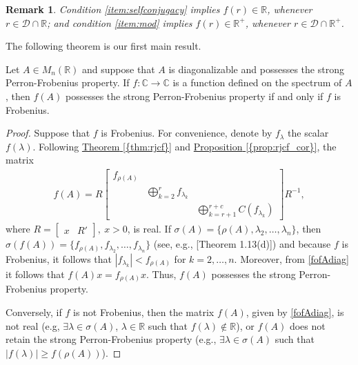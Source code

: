 \documentclass[10pt,twoside,leqno]{siamltex}
\newtheorem{rem}[theorem]{Remark}
\begin{document}
\begin{rem}
{\rm Condition \ref*{item:selfconjugacy} implies $f(r) \in {\mathbb{{R}}}$, whenever $r \in \mathcal{D} \cap {\mathbb{{R}}}$; and condition \ref*{item:mod} implies $f(r) \in {\mathbb{{R}}}^+$, whenever $r \in \mathcal{D} \cap {\mathbb{{R}}}^+$.}
\end{rem}

The following theorem is our first main result. 

\begin{theorem} \label{mainresultdiag}
Let $A \in {M_{{n}}({{\mathbb{{R}}}})}$ and suppose that $A$ is diagonalizable and possesses the strong Perron-Frobenius property. If $f: {\mathbb{{C}}} \longrightarrow {\mathbb{{C}}}$ is a function defined on the spectrum of $A$, then $f(A)$ possesses the strong Perron-Frobenius property if and only if $f$ is Frobenius.
\end{theorem}

\begin{proof}
Suppose that $f$ is Frobenius. For convenience, denote by $f_\lambda$ the scalar $f(\lambda)$. Following {\hyperref[{thm:rjcf}]{{\rm {Theorem} \ref*{{thm:rjcf}}}}} and {\hyperref[{prop:rjcf_cor}]{{\rm {Proposition} \ref*{{prop:rjcf_cor}}}}}, the matrix
\begin{align}  
f(A)  = 
R \begin{bmatrix} 
f_{{\rho\left({A}\right)}} & & 					\\
& \bigoplus_{k=2}^{r} f_{\lambda_k} & 	\\ 
& & \bigoplus_{k = r + 1}^{r + c} C (f_{\lambda_k})  
\end{bmatrix} {{R}^{-1}}, 													\label{fofAdiag} 
\end{align}
where $R= 
\begin{bmatrix}
x & R'
\end{bmatrix},~x>0$,
is real. If ${\sigma \left( {A} \right)} = \{ {\rho\left({A}\right)}, \lambda_2,\dots, \lambda_n \}$, then ${\sigma \left( {f(A)} \right)} = \{ f_{{\rho\left({A}\right)}},f_{\lambda_2},\dots, f_{\lambda_n} \}$ (see, e.g., \cite{h2008}[Theorem 1.13(d)]) and because $f$ is Frobenius, it follows that $|f_{\lambda_k}| < f_{{\rho\left({A}\right)}}$ for $k = 2,\dots, n$. Moreover, from \eqref{fofAdiag} it follows that $f(A)x = f_{{\rho\left({A}\right)}} x$. Thus, $f(A)$ possesses the strong Perron-Frobenius property.  

Conversely, if $f$ is not Frobenius, then the matrix $f(A)$, given by \eqref{fofAdiag}, is not real (e.g, $\exists \lambda \in {\sigma \left( {A} \right)}$, $\lambda \in {\mathbb{{R}}}$ such that $f(\lambda) \not \in {\mathbb{{R}}}$), or $f(A)$ does not retain the strong Perron-Frobenius property (e.g., $\exists \lambda \in {\sigma \left( {A} \right)}$ such that $|f(\lambda)| \geq f({\rho\left({A}\right)})$). 
\end{proof}
\end{document}
